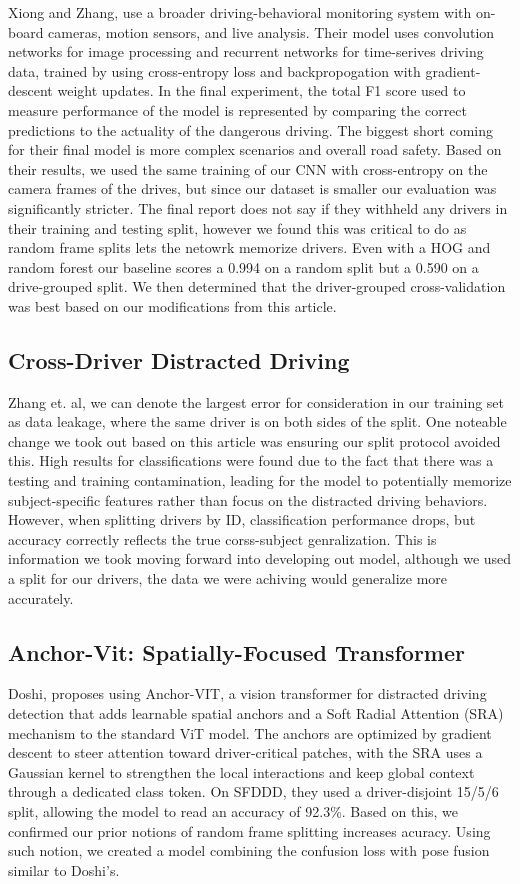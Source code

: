 Xiong and Zhang\cite{xiongDrivingBehavior2026}, use a broader driving-behavioral monitoring system with on-board cameras, motion sensors, and live analysis.
Their model uses convolution networks for image processing and recurrent networks for time-serives driving data, trained by using cross-entropy loss and backpropogation with gradient-descent weight updates.
In the final experiment, the total F1 score used to measure performance of the model is represented by comparing the correct predictions to the actuality of the dangerous driving.
The biggest short coming for their final model is more complex scenarios and overall road safety. 
Based on their results, we used the same training of our CNN with cross-entropy on the camera frames of the drives, but since our dataset is smaller our evaluation was significantly stricter.
The final report does not say if they withheld any drivers in their training and testing split, however we found this was critical to do as random frame splits lets the netowrk memorize drivers.
Even with a HOG and random forest our baseline scores a 0.994 on a random split but a 0.590 on a drive-grouped split.
We then determined that the driver-grouped cross-validation was best based on our modifications from this article.

\subsection{Cross-Driver Distracted Driving}
Zhang et. al\cite{zhangCrossDriver}, we can denote the largest error for consideration in our training set as data leakage, where the same driver is on both sides of the split.
One noteable change we took out based on this article was ensuring our split protocol avoided this.
High results for classifications were found due to the fact that there was a testing and training contamination, leading for the model to potentially memorize subject-specific features rather than focus on the distracted driving behaviors.
However, when splitting drivers by ID, classification performance drops, but accuracy correctly reflects the true corss-subject genralization.
This is information we took moving forward into developing out model, although we used a split for our drivers, the data we were achiving would generalize more accurately.

\subsection{Anchor-Vit: Spatially-Focused Transformer}
Doshi\cite{doshiAnchorVIT}, proposes using Anchor-VIT, a vision transformer for distracted driving detection that adds learnable spatial anchors and a Soft Radial Attention (SRA) mechanism to the standard ViT model.
The anchors are optimized by gradient descent to steer attention toward driver-critical patches, with the SRA uses a Gaussian kernel to strengthen the local interactions and keep global context through a dedicated class token.
On SFDDD, they used a driver-disjoint 15/5/6 split, allowing the model to read an accuracy of 92.3\%.
Based on this, we confirmed our prior notions of random frame splitting increases acuracy.
Using such notion, we created a model combining the confusion loss with pose fusion similar to Doshi's.

